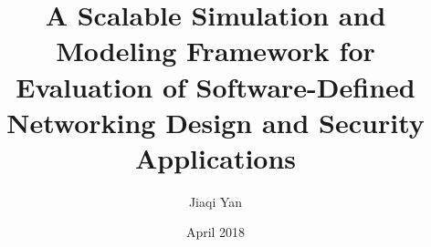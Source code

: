 \documentclass{iitthesis}
\theoremstyle{definition}
\begin{document}
\title{A Scalable Simulation and Modeling Framework for Evaluation of
Software-Defined Networking Design and Security Applications
}
\author{Jiaqi Yan}
\date{April 2018}
\copyrightnoticetrue      %
\maketitle                %


\prelimpages         %




\tableofcontents
\clearpage

\listoftables

\clearpage

\listoffigures

\clearpage



\clearpage
\end{document}
